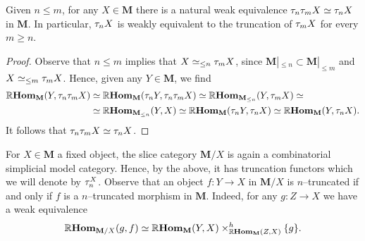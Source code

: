 \documentclass[main.tex]{subfiles}
\begin{document}
\begin{corollary}
  Given \(n \leq m\), for any \(X\in\mathbf M\) there is a natural weak
  equivalence \(\tau_{n}\tau_{m} X \simeq \tau_{n} X\) in \(\mathbf M\). In
  particular, \(\tau_{n}X\) is weakly equivalent to the  truncation of
  \(\tau_{m}X\) for every \(m\geq n\).
\end{corollary}
\begin{proof}
  Observe that \(n\leq m\) implies that \(X \simeq_{\leq n}\tau_{m}X\), since
  \(\mathbf M|_{\leq n}\subset \mathbf M|_{\leq m}\) and \(X\simeq_{\leq
    m}\tau_{m}X\). Hence, given any \(Y\in\mathbf M\), we find
  \begin{align*}
    \operatorname{\mathbb{R}\textnormal{\bfseries Hom}}_{\mathbf M}(Y, \tau_{n}\tau_{m} X)&\simeq \operatorname{\mathbb{R}\textnormal{\bfseries Hom}}_{\mathbf M}(\tau_{n}Y, \tau_{n}\tau_{m}X)\simeq \operatorname{\mathbb{R}\textnormal{\bfseries Hom}}_{\mathbf M_{\leq n}}(Y, \tau_{m}X)\simeq \\
                                              &\simeq \operatorname{\mathbb{R}\textnormal{\bfseries Hom}}_{\mathbf M_{\leq n}}(Y, X) \simeq \operatorname{\mathbb{R}\textnormal{\bfseries Hom}}_{\mathbf M}(\tau_{n}Y, \tau_{n}X)\simeq \operatorname{\mathbb{R}\textnormal{\bfseries Hom}}_{\mathbf M}(Y, \tau_{n}X).
  \end{align*}
  It follows that \(\tau_{n}\tau_{m}X\simeq \tau_{n}X\).
\end{proof}

For \(X\in\mathbf{M}\) a fixed object, the slice category \(\mathbf M/X\) is
again a combinatorial simplicial model category. Hence, by the above, it has
truncation functors which we will denote by \(\tau_{n}^{X}\). Observe that an
object \(f\colon Y\to X\) in \(\mathbf M/X\) is \(n\)--truncated if and only if
\(f\) is a \(n\)--truncated morphism in \(\mathbf M\). Indeed, for any \(g\colon
Z\to X\) we have a weak equivalence
\[
  \operatorname{\mathbb{R}\textnormal{\bfseries Hom}}_{\mathbf M/X}(g, f)\simeq \operatorname{\mathbb{R}\textnormal{\bfseries Hom}}_{\mathbf M}(Y,
  X)\times^{h}_{\operatorname{\mathbb{R}\textnormal{\bfseries Hom}}_{\mathbf M}(Z, X)} \{g\}.
\]
\end{document}
